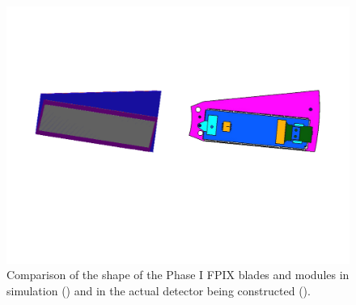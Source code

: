 \begin{figure}[hbtp]
  \begin{center}
    \includegraphics[width=2.0\cmsFigWidth]{figures/phaseI_bladecomparison}
    \caption{Comparison of the shape of the Phase I FPIX blades and modules in simulation (\cmsLeft) and in the actual detector being constructed (\cmsRight).}
    \label{fig:phaseI_bladecomparison}
  \end{center}
\end{figure}
